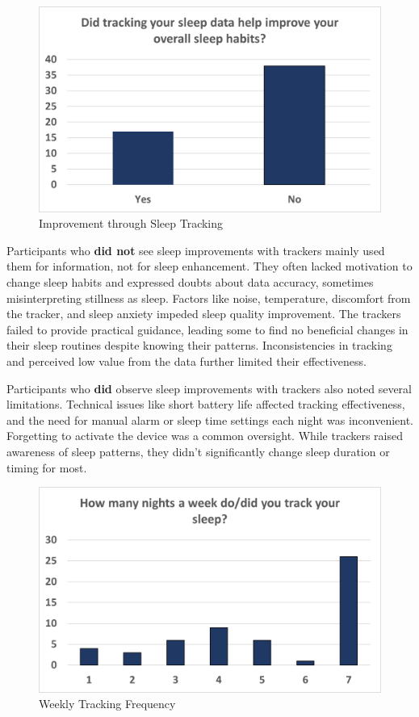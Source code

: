 \documentclass[
  a4paper,  %
  twoside,  %
  bibliography=totoc,
  headsepline,
  cleardoublepage=empty,
  parskip=half,
  draft=false
]{scrbook}
\begin{document}
\begin{figure} [H]
    \centering
    \includegraphics[scale=0.8]{graphics/Tracking_Improve.png}
    \caption{Improvement through Sleep Tracking}
    \label{fig:improvement}
\end{figure}
Participants who \textbf{did not} see sleep improvements with trackers mainly used them for information, not for sleep enhancement. They often lacked motivation to change sleep habits and expressed doubts about data accuracy, sometimes misinterpreting stillness as sleep. Factors like noise, temperature, discomfort from the tracker, and sleep anxiety impeded sleep quality improvement. The trackers failed to provide practical guidance, leading some to find no beneficial changes in their sleep routines despite knowing their patterns. Inconsistencies in tracking and perceived low value from the data further limited their effectiveness.

Participants who \textbf{did} observe sleep improvements with trackers also noted several limitations. Technical issues like short battery life affected tracking effectiveness, and the need for manual alarm or sleep time settings each night was inconvenient. Forgetting to activate the device was a common oversight. While trackers raised awareness of sleep patterns, they didn't significantly change sleep duration or timing for most.

\begin{figure} [H]
    \centering
    \includegraphics[scale=0.8]{graphics/How_Many_Nights.png}
    \caption{Weekly Tracking Frequency}
    \label{fig:weekly}
\end{figure}
\end{document}

